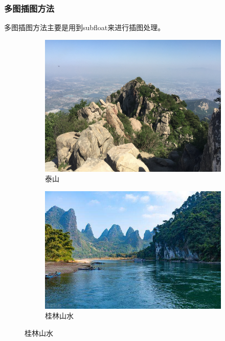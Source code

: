 \subsubsection{多图插图方法}
多图插图方法主要是用到subfloat来进行插图处理。
\begin{figure}[htbp]
    \begin{subfigure}[b]{0.4\textwidth}
        \centering
        \includegraphics[width=\textwidth]{figures/taishan.jpeg}
        \caption{泰山}
        \label{fig:a}
    \end{subfigure}
    \begin{subfigure}[b]{0.4\textwidth}
        \centering
        \includegraphics[width=\textwidth]{figures/guilin.jpeg}
        \caption{桂林山水}
        \label{fig:b}
    \end{subfigure}

\end{figure}
